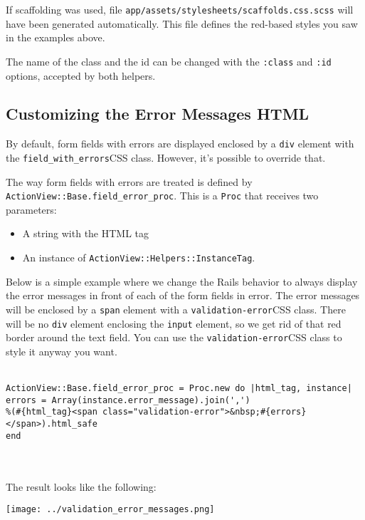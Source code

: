 \documentclass[10pt]{book}
\begin{document}
If scaffolding was used, file \texttt{app/assets/stylesheets/scaffolds.css.scss} will have been generated automatically. This file defines the red-based styles you saw in the examples above.

The name of the class and the id can be changed with the \texttt{:class} and \texttt{:id} options, accepted by both helpers.

\subsection{ Customizing the Error Messages HTML}

By default, form fields with errors are displayed enclosed by a \texttt{div} element with the \texttt{field\_with\_errors}CSS class. However, it’s possible to override that.

The way form fields with errors are treated is defined by \texttt{ActionView::Base.field\_error\_proc}. This is a \texttt{Proc} that receives two parameters:
\begin{itemize}
	\item A string with the HTML tag
	\item An instance of \texttt{ActionView::Helpers::InstanceTag}.
\end{itemize}

Below is a simple example where we change the Rails behavior to  always display the error messages in front of each of the form fields in  error. The error messages will be enclosed by a \texttt{span} element with a \texttt{validation-error}CSS class. There will be no \texttt{div} element enclosing the \texttt{input} element, so we get rid of that red border around the text field. You can use the \texttt{validation-error}CSS class to style it anyway you want.
\\ \\
\begin{minipage}{\textwidth}{\scriptsize
\begin{verbatim}
ActionView::Base.field_error_proc = Proc.new do |html_tag, instance|
errors = Array(instance.error_message).join(',')
%(#{html_tag}<span class="validation-error">&nbsp;#{errors}</span>).html_safe
end
\end{verbatim}}
\end{minipage}
\\ \\

The result looks like the following:


\texttt{[image: ../validation\_error\_messages.png]}
\end{document}
